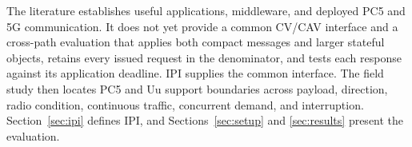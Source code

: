 The literature establishes useful applications, middleware, and deployed PC5
and 5G communication. It does not yet provide a common CV/CAV interface and a
cross-path evaluation that applies both compact messages and larger stateful
objects, retains every issued request in the denominator, and tests each
response against its application deadline. IPI supplies the common interface.
The field study then locates PC5 and Uu support boundaries across payload,
direction, radio condition, continuous traffic, concurrent demand, and
interruption. Section~\ref{sec:ipi} defines IPI, and
Sections~\ref{sec:setup} and \ref{sec:results} present the evaluation.
